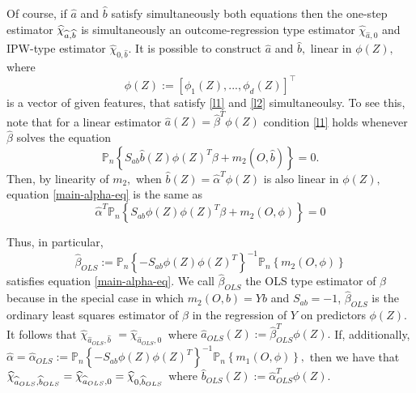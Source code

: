 \documentclass{article}
\begin{document}
Of course, if $\widehat{a}$ and $\widehat{b}$ satisfy simultaneously both
equations then the one-step estimator $\widehat{\chi }_{\widehat{a},\widehat{%
b}}$ is simultaneously an outcome-regression type estimator $\widehat{\chi }%
_{\widehat{a},0}$ and IPW-type estimator $\widehat{\chi }_{0,\widehat{b}}$.
It is possible to construct $\widehat{a}$ and $\widehat{b},$ linear in $\phi
\left( Z\right) ,$ where 
\begin{equation*}
\phi \left( Z\right) :=[\phi _{1}\left( Z\right) ,...,\phi _{d}\left(
Z\right) ]^{\top }
\end{equation*}%
is a vector of given features, that satisfy \eqref{l1} and \eqref{l2}
simultaneoulsy. To see this, note that for a linear estimator $\widehat{a}%
(Z)=\widehat{\beta }^{T}\phi \left( Z\right) $ condition \eqref{l1} holds
whenever $\widehat{\beta }$ solves the equation 
\begin{equation}
\mathbb{P}_{n}\left\{ S_{ab}\widehat{b}(Z)\phi \left( Z\right) ^{T}\beta
+m_{2}(O,\widehat{b})\right\} =0.  \label{main-alpha-eq}
\end{equation}%
Then, by linearity of $m_{2},$ when $\widehat{b}(Z)=\widehat{\alpha }%
^{T}\phi \left( Z\right) $ is also linear in $\phi \left( Z\right) ,$
equation \eqref{main-alpha-eq} is the same as 
\begin{equation*}
\widehat{\alpha }^{T}\mathbb{P}_{n}\left\{ S_{ab}\phi \left( Z\right) \phi
\left( Z\right) ^{T}\beta +m_{2}(O,\phi )\right\} =0
\end{equation*}

Thus, in particular, 
\begin{equation*}
\widehat{\beta }_{OLS}:=\mathbb{P}_{n}\left\{ -S_{ab}\phi \left( Z\right)
\phi \left( Z\right) ^{T}\right\} ^{-1}\mathbb{P}_{n}\left\{ m_{2}(O,\phi
)\right\} 
\end{equation*}%
satisfies equation \eqref{main-alpha-eq}. We call $\widehat{\beta }_{OLS}$
the OLS type estimator of $\beta $ because in the special case in which $%
m_{2}(O,b)=Yb$ and $S_{ab}=-1$, $\widehat{\beta }_{OLS}$ is the ordinary
least squares estimator of $\beta $ in the regression of $Y$ on predictors $%
\phi (Z).$ It follows that $\widehat{\chi }_{\widehat{a}_{OLS},\widehat{b}}$ 
$=\widehat{\chi }_{\widehat{a}_{OLS},0}$ $\ $where $\widehat{a}_{OLS}(Z):=%
\widehat{\beta }_{OLS}^{T}\phi \left( Z\right) .$ If, additionally, $%
\widehat{\alpha }=\widehat{\alpha }_{OLS}:=\mathbb{P}_{n}\left\{ -S_{ab}\phi
\left( Z\right) \phi \left( Z\right) ^{T}\right\} ^{-1}\mathbb{P}_{n}\left\{
m_{1}(O,\phi )\right\} ,$ then we have that $\widehat{\chi }_{\widehat{a}%
_{OLS},\widehat{b}_{OLS}}=\widehat{\chi }_{\widehat{a}_{OLS},0}=\widehat{%
\chi }_{0,\widehat{b}_{OLS}}$ where $\widehat{b}_{OLS}(Z):=\widehat{\alpha }%
_{OLS}^{T}\phi \left( Z\right) .$ 
\end{document}
